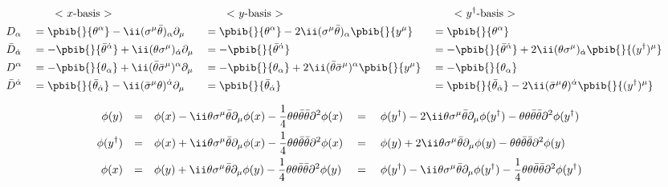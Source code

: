 \begin{align}
&&& \notag
 && \qquad\text{< $x$-basis >} && \qquad\text{< $y$-basis >}&&\qquad\text{< $y^\dagger$-basis >}\\
&&&D_\alpha      &&=\pbib{}{\theta^\alpha}-\ii(\Sm\btheta)_\alpha\Pm
                 &&=\pbib{}{\theta^\alpha} - 2\ii(\Sm\btheta)_\alpha\pbib{}{y^\mu}
                 &&=\pbib{}{\theta^\alpha}&&\\
&&&\bar D_\dalpha&&=-\pbib{}{\btheta^\dalpha}+\ii(\theta\Sm)_\dalpha\Pm
                 &&=-\pbib{}{\btheta^\dalpha}
                 &&=-\pbib{}{\btheta^\dalpha}+2\ii(\theta\Sm)_\dalpha\pbib{}{(y^\dagger)^\mu}&&\\
&&&D^\alpha      &&=-\pbib{}{\theta_\alpha}+\ii(\btheta\bSm)^\alpha\Pm
                 &&=-\pbib{}{\theta_\alpha}+2\ii(\btheta\bSm)^\alpha\pbib{}{y^\mu}
                 &&=-\pbib{}{\theta_\alpha}&&\\
&&&\bar D^\dalpha&&=\pbib{}{\btheta_\dalpha}-\ii(\bSm\theta)^\dalpha\Pm
                 &&=\pbib{}{\btheta_\dalpha}
                 &&=\pbib{}{\btheta_\dalpha}-2\ii(\bSm\theta)^\dalpha\pbib{}{(y^\dagger)^\mu}
\end{align}


\begin{align}
 \phi(y)
&&=&&&{} \phi(x) - \ii\theta\Sm\btheta\Pm\phi(x)-\frac14\thth\bthth\Psq\phi(x)&&
 ={}&& \phi(y^\dagger)  -2\ii\theta\Sm\btheta\Pm\phi(y^\dagger)-\thth\bthth\Psq\phi(y^\dagger)\\
 \phi(y^\dagger)
&&=&&&{} \phi(x) + \ii\theta\Sm\btheta\Pm\phi(x)-\frac14\thth\bthth\Psq\phi(x)&&
={}&& \phi(y) + 2\ii\theta\Sm\btheta\Pm\phi(y)-\thth\bthth\Psq\phi(y)\\
 \phi(x)
&&=&&&{} \phi(y) + \ii\theta\Sm\btheta\Pm\phi(y)-\frac14\thth\bthth\Psq\phi(y)&&
={}&& \phi(y^\dagger) - \ii\theta\Sm\btheta\Pm\phi(y^\dagger)-\frac14\thth\bthth\Psq\phi(y^\dagger)
\end{align}

\newpage
